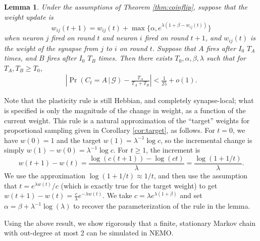 \documentclass{article}
\newtheorem{lemma}[theorem]{Lemma}
\theoremstyle{remark}
\newcommand{\1}{\mathbbm{1}}
\newcommand{\cond}{\, | \,}
\begin{document}
\begin{lemma} \label{lemma:plasticity}
    Under the assumptions of Theorem \ref{thm:coinflip}, suppose that the weight update is
    \[w_{ij}(t+1) = w_{ij}(t) + \max\{\alpha, e^{\lambda (1 + \beta - w_{ij}(t))}\}\]
    when neuron $j$ fired on round $t$ and neuron $i$ fired on round $t+1$, and $w_{ij}(t)$ is the weight of the synapse from $j$ to $i$ on round $t$. Suppose that $A$ fires after $I_0$ $T_A$ times, and $B$ fires after $I_0$ $T_B$ times. Then there exists $T_0, \alpha, \beta, \lambda$ such that for $T_A, T_B \ge T_0$,
    \begin{align*}
        \left|\Pr(C_t = A \cond \mathcal G) - \frac{T_A}{T_A + T_B}\right| < \frac{1}{25} + o(1).
    \end{align*}
\end{lemma}
Note that the plasticity rule is still Hebbian, and completely synapse-local; what is specified is only the magnitude of the change in weight, as a function of the current weight.  This rule is a natural approximation of the ``target'' weights for proportional sampling given in Corollary \ref{cor:target}, as follows. For $t=0$, we have $w(0) = 1$ and the target $w(1) = \lambda^{-1} \log c$, so the incremental change is simply $w(1) - w(0) = \lambda^{-1} \log c$. For $t \ge 1$, the increment is 
\[w(t+1) - w(t) = \frac{\log(c(t+1)) - \log (ct)}{\lambda} = \frac{\log(1+1/t)}{\lambda}.\]
 We use the approximation $\log(1 + 1/t) \approx 1/t$, and then use the assumption that $t = e^{\lambda w(t)} / c$ (which is exactly true for the target weight) to get $w(t+1) - w(t) = \frac{c}{\lambda} e^{-\lambda w(t)}$. We take $c = \lambda e^{\lambda(1 + \beta)}$ and set $\alpha = \beta + \lambda^{-1} \log( \lambda)$ to recover the parameterization of the rule in the lemma.

Using the above result, we show rigorously that a finite, stationary Markov chain with out-degree at most 2 can be simulated in NEMO.
\end{document}
